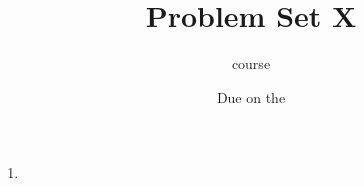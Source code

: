 




\title{Problem Set X}
\author[Daniel Gonzalez Cedre]{course}
\date{Due on the }



\maketitle

\begin{enumerate}
  \item
\end{enumerate}


